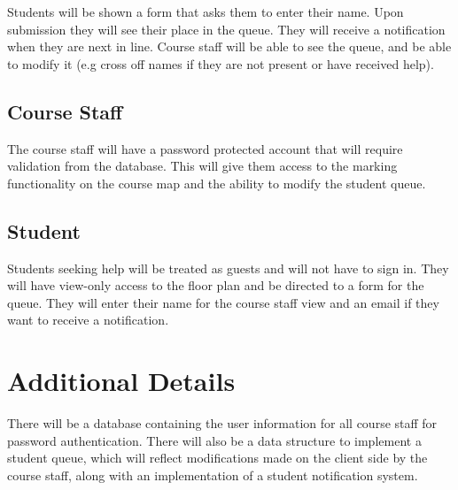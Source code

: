 \documentclass{article}
\begin{document}
Students will be shown a form that asks them to enter their name. Upon submission they will see their place in the queue. They will receive a notification when they are next in line. Course staff will be able to see the queue, and be able to modify it (e.g cross off names if they are not present or have received help).

\subsection*{Course Staff}

The course staff will have a password protected account that will require validation from the database. This will give them access to the marking functionality on the course map and the ability to modify the student queue.

\subsection*{Student}

Students seeking help will be treated as guests and will not have to sign in. They will have view-only access to the floor plan and be directed to a form for the queue. They will enter their name for the course staff view and an email if they want to receive a notification.

\section*{Additional Details}

There will be a database containing the user information for all course staff for password authentication. There will also be a data structure to implement a student queue, which will reflect modifications made on the client side by the course staff, along with an implementation of a student notification system.
\end{document}
